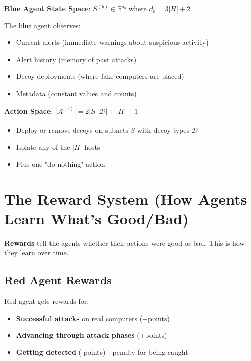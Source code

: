 \documentclass[11pt]{article}
\begin{document}
\begin{mathdetails}
\textbf{Blue Agent State Space}: $S^{(b)} \in \mathbb{R}^{d_b}$ where $d_b = 3|H| + 2$

The blue agent observes:
\begin{itemize}
\item Current alerts (immediate warnings about suspicious activity)
\item Alert history (memory of past attacks)
\item Decoy deployments (where fake computers are placed)
\item Metadata (constant values and counts)
\end{itemize}

\textbf{Action Space}: $|\mathcal{A}^{(b)}| = 2|S||\mathcal{D}| + |H| + 1$
\begin{itemize}
\item Deploy or remove decoys on subnets $S$ with decoy types $\mathcal{D}$
\item Isolate any of the $|H|$ hosts
\item Plus one "do nothing" action
\end{itemize}
\end{mathdetails}

\section{The Reward System (How Agents Learn What's Good/Bad)}

\begin{foundation}
\textbf{Rewards} tell the agents whether their actions were good or bad. This is how they learn over time.
\end{foundation}

\subsection{Red Agent Rewards}

\begin{intuition}
Red agent gets rewards for:
\begin{itemize}
\item \textbf{Successful attacks} on real computers (+points)
\item \textbf{Advancing through attack phases} (+points)
\item \textbf{Getting detected} (-points) - penalty for being caught
\end{itemize}
\end{intuition}
\end{document}

